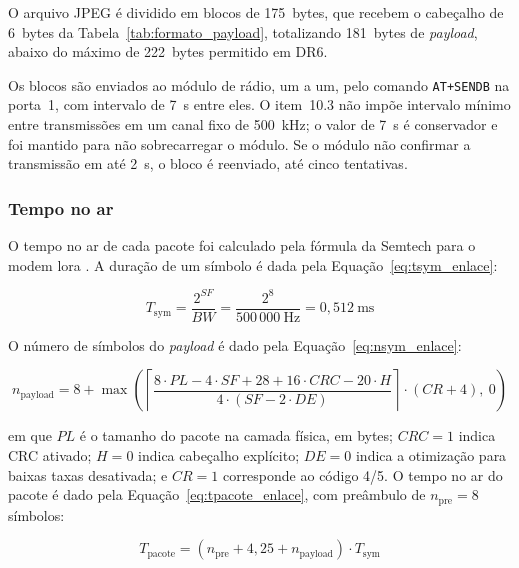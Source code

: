 O arquivo JPEG é dividido em blocos de 175~bytes, que recebem o cabeçalho de 6~bytes da
Tabela~\ref{tab:formato_payload}, totalizando 181~bytes de \textit{payload}, abaixo do
máximo de 222~bytes permitido em DR6.

Os blocos são enviados ao módulo de rádio, um a um, pelo comando \texttt{AT+SENDB} na
porta~1, com intervalo de 7~s entre eles. O item~10.3 não impõe intervalo mínimo entre
transmissões em um canal fixo de 500~kHz; o valor de 7~s é conservador e foi mantido para
não sobrecarregar o módulo. Se o módulo não confirmar a transmissão em até 2~s, o bloco é
reenviado, até cinco tentativas.

\subsubsection{Tempo no ar}
\label{subsubsec:tempo_no_ar}

O tempo no ar de cada pacote foi calculado pela fórmula da Semtech para o modem \gls{lora}
\cite{semtech2013an1200_13}. A duração de um símbolo é dada pela
Equação~\ref{eq:tsym_enlace}:

\begin{equation}
    \label{eq:tsym_enlace}
    T_{\text{sym}} = \frac{2^{SF}}{BW} = \frac{2^{8}}{500\,000~\text{Hz}} = 0{,}512~\text{ms}
\end{equation}

O número de símbolos do \textit{payload} é dado pela Equação~\ref{eq:nsym_enlace}:

\begin{equation}
    \label{eq:nsym_enlace}
    n_{\text{payload}} = 8 + \max\left(\left\lceil
    \frac{8 \cdot PL - 4 \cdot SF + 28 + 16 \cdot CRC - 20 \cdot H}{4 \cdot (SF - 2 \cdot DE)}
    \right\rceil \cdot (CR + 4),\ 0\right)
\end{equation}

\noindent em que $PL$ é o tamanho do pacote na camada física, em bytes; $CRC = 1$ indica
CRC ativado; $H = 0$ indica cabeçalho explícito; $DE = 0$ indica a otimização para baixas
taxas desativada; e $CR = 1$ corresponde ao código 4/5. O tempo no ar do pacote é dado pela
Equação~\ref{eq:tpacote_enlace}, com preâmbulo de $n_{\text{pre}} = 8$ símbolos:

\begin{equation}
    \label{eq:tpacote_enlace}
    T_{\text{pacote}} = (n_{\text{pre}} + 4{,}25 + n_{\text{payload}}) \cdot T_{\text{sym}}
\end{equation}

